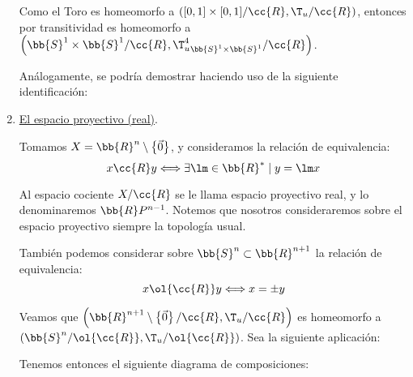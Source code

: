 \begin{ejemplo}
\begin{enumerate}
        Como el Toro es homeomorfo a $\left([0,1]\times [0,1]/\cc{R}, \T_u/\cc{R}\right)$, entonces por transitividad es homeomorfo a $\left(\bb{S}^1\times \bb{S}^1/\cc{R}, {\T_u^4}_{\bb{S}^1\times \bb{S}^1}/\cc{R}\right)$.

        Análogamente, se podría demostrar haciendo uso de la siguiente identificación:
        
        \item \ul{El espacio proyectivo (real)}.

        Tomamos $X=\bb{R}^n\setminus \left\{\vec{0}\right\}$, y consideramos la relación de equivalencia:
        \begin{equation*}
            x\cc{R}y \Longleftrightarrow \exists\lm \in \bb{R}^\ast\mid y =\lm x 
        \end{equation*}

        Al espacio cociente $X/\cc{R}$ se le llama espacio proyectivo real, y lo denominaremos $\bb{R}P^{n-1}$. Notemos que nosotros consideraremos sobre el espacio proyectivo siempre la topología usual.

        También podemos considerar sobre $\bb{S}^n\subset \bb{R}^{n+1}$ la relación de equivalencia:
        \begin{equation*}
            x\ol{\cc{R}}y \Longleftrightarrow x=\pm y
        \end{equation*}

        
        Veamos que $\left(\bb{R}^{n+1}\setminus \left\{\vec{0}\right\}/\cc{R}, \T_u/\cc{R}\right)$ es homeomorfo a $(\bb{S}^n/\ol{\cc{R}}, \T_u/\ol{\cc{R}})$. Sea la siguiente aplicación:

        Tenemos entonces el siguiente diagrama de composiciones:
        \begin{figure}[H]
            \centering
        \end{figure}


\end{enumerate}
\end{ejemplo}
